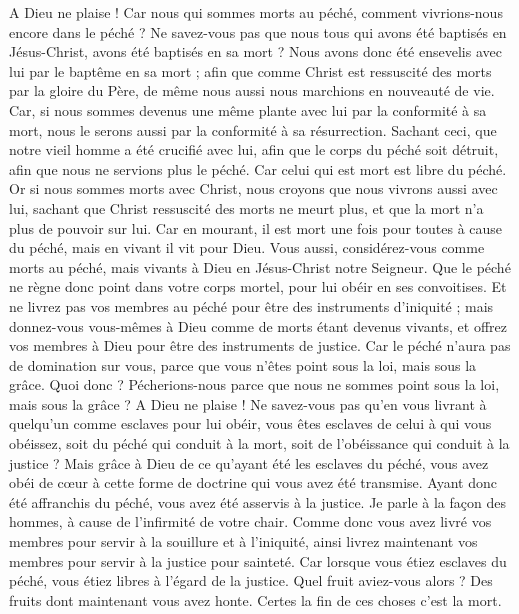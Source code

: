 \begin{multicols}{2}
A Dieu ne plaise ! Car nous qui sommes morts au péché, comment vivrions-nous encore dans le péché ?
Ne savez-vous pas que nous tous qui avons été baptisés en Jésus-Christ, avons été baptisés en sa mort ?
Nous avons donc été ensevelis avec lui par le baptême en sa mort ; afin que comme Christ est ressuscité des morts par la gloire du Père, de même nous aussi nous marchions en nouveauté de vie.
Car, si nous sommes devenus une même plante avec lui par la conformité à sa mort, nous le serons aussi par la conformité à sa résurrection.
Sachant ceci, que notre vieil homme a été crucifié avec lui, afin que le corps du péché soit détruit, afin que nous ne servions plus le péché.
Car celui qui est mort est libre du péché.
Or si nous sommes morts avec Christ, nous croyons que nous vivrons aussi avec lui,
sachant que Christ ressuscité des morts ne meurt plus, et que la mort n'a plus de pouvoir sur lui.
Car en mourant, il est mort une fois pour toutes à cause du péché, mais en vivant il vit pour Dieu.
Vous aussi, considérez-vous comme morts au péché, mais vivants à Dieu en Jésus-Christ notre Seigneur.
Que le péché ne règne donc point dans votre corps mortel, pour lui obéir en ses convoitises.
Et ne livrez pas vos membres au péché pour être des instruments d'iniquité ; mais donnez-vous vous-mêmes à Dieu comme de morts étant devenus vivants, et offrez vos membres à Dieu pour être des instruments de justice.
Car le péché n'aura pas de domination sur vous, parce que vous n'êtes point sous la loi, mais sous la grâce.
Quoi donc ? Pécherions-nous parce que nous ne sommes point sous la loi, mais sous la grâce ? A Dieu ne plaise !
Ne savez-vous pas qu'en vous livrant à quelqu'un comme esclaves pour lui obéir, vous êtes esclaves de celui à qui vous obéissez, soit du péché qui conduit à la mort, soit de l'obéissance qui conduit à la justice ?
Mais grâce à Dieu de ce qu'ayant été les esclaves du péché, vous avez obéi de cœur à cette forme de doctrine qui vous avez été transmise.
Ayant donc été affranchis du péché, vous avez été asservis à la justice.
Je parle à la façon des hommes, à cause de l'infirmité de votre chair. Comme donc vous avez livré vos membres pour servir à la souillure et à l'iniquité, ainsi livrez maintenant vos membres pour servir à la justice pour sainteté.
Car lorsque vous étiez esclaves du péché, vous étiez libres à l'égard de la justice.
Quel fruit aviez-vous alors ? Des fruits dont maintenant vous avez honte. Certes la fin de ces choses c'est la mort.

\end{multicols}
